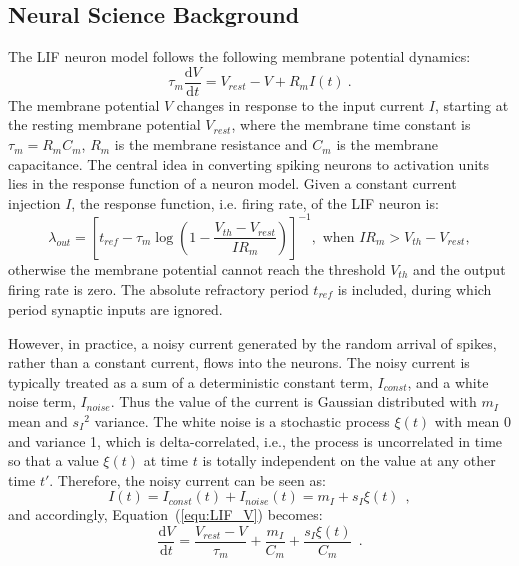 \documentclass[runningheads,a4paper]{llncs}
\def\D{\mathrm{d}}
\begin{document}
\subsection{Neural Science Background}
The LIF neuron model follows the following membrane potential dynamics:
\begin{equation}
\tau_m \frac{\D V}{\D t}=V_{rest} - V + R_{m} I(t) ~.
\label{equ:LIF_V}
\end{equation}
The membrane potential $V$ changes in response to the input current $I$, starting at the resting membrane potential $V_{rest}$, where the membrane time constant is $\tau_m = R_mC_m$, $R_m$ is the membrane resistance and $C_m$ is the membrane capacitance.
The central idea in converting spiking neurons to activation units lies in the response function of a neuron model.
Given a constant current injection $I$, the response function, i.e. firing rate, of the LIF neuron is:
\begin{equation}
\lambda_\mathit{out}=
\left [ t_\mathit{ref}-\tau_m\log \left ( 1-\frac{V_{th}-V_\mathit{rest}}{IR_m}  \right )\right ]^{-1}, \textrm{~when~} IR_m>V_{th}-V_{rest},
\label{equ:consI}
\end{equation}
otherwise the membrane potential cannot reach the threshold $V_{th}$ and the output firing rate is zero. 
The absolute refractory period $t_\mathit{ref}$ is included, during which period synaptic inputs are ignored.

However, in practice, a noisy current generated by the random arrival of spikes, rather than a constant current, flows into the neurons.
The noisy current is typically treated as a sum of a deterministic constant term, $I_{const}$, and a white noise term, $I_{noise}$.
Thus the value of the current is Gaussian distributed with $m_I$ mean and ${s_I}^2$ variance.
The white noise is a stochastic process $\xi(t)$ with mean 0 and variance 1, which is delta-correlated, i.e., the process is uncorrelated in time so that a value $\xi(t)$ at time $t$ is totally independent on the value at any other time $t'$.
Therefore, the noisy current can be seen as:
\begin{equation}
I(t) = I_{const}(t)+I_{noise}(t) = m_I + s_I\xi(t)~~,
\label{equ:noisyI}
\end{equation}
and accordingly, Equation~(\ref{equ:LIF_V}) becomes:
\begin{equation}
\frac{\D V}{\D t}=\frac{V_{rest} - V}{\tau_m } + \frac{m_I}{C_m} + \frac{s_I\xi(t)}{C_m}~~.
\label{equ:LIF_V2}
\end{equation}
\end{document}

